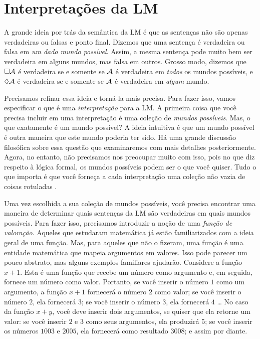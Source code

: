 \section{Interpretações da LM}

A grande ideia por trás da semântica da LM é que as sentenças não são apenas verdadeiras ou falsas e ponto final.  Dizemos que uma  sentença é verdadeira ou falsa em \emph{um dado mundo possível}. Assim,  a mesma sentença pode muito bem ser verdadeira em alguns mundos,  mas falsa em outros. Grosso modo, dizemos que $\Box \mathcal{A}$ é verdadeira   se e somente se $\mathcal{A}$ é verdadeira em \emph{todos} os mundos possíveis, e $\Diamond\mathcal{A}$ é verdadeira se e somente se  $\mathcal{A}$ é verdadeira em \emph{algum} mundo.

Precisamos refinar essa ideia e torná-la mais precisa. Para fazer isso,  vamos especificar o que é uma  \emph{interpretação} para a LM. A primeira coisa que você precisa incluir em uma interpretação é uma coleção de \emph{mundos possíveis}. Mas, o que exatamente é um mundo possível? A ideia intuitiva é que um mundo possível é outra maneira que este mundo poderia ter sido. Há uma grande discussão filosófica sobre  essa questão que examinaremos com mais detalhes posteriormente. Agora, no entanto,  não precisamos nos preocupar muito com isso, pois no que diz respeito à lógica formal, os mundos possíveis podem ser o que você quiser. Tudo o que importa é que você forneça a cada interpretação uma coleção não vazia de coisas rotuladas .
 
Uma vez escolhida  a  sua coleção de mundos possíveis, você precisa encontrar uma maneira de determinar quais sentenças da LM são verdadeiras em quais mundos possíveis. Para fazer isso, precisamos introduzir a noção de uma \emph{função de valoração}. Aqueles que estudaram matemática já estão familiarizados com a ideia geral de uma função. Mas, para aqueles que não o fizeram, uma função é uma entidade matemática que mapeia argumentos em valores. Isso pode parecer um pouco abstrato, mas alguns exemplos familiares ajudarão. Considere a função $x + 1$. Esta é uma função que recebe um número como argumento e, em seguida, fornece um número como valor. Portanto, se você inserir o número $1$ como um argumento, a função $x + 1$ fornecerá o número $2$ como valor; se você inserir o número  $2$, ela fornecerá $3$; se você inserir o número  $3$, ela fornecerá $4$ \dots{}  No caso da função $x + y$, você deve inserir dois argumentos, se quiser que ela retorne um valor: se você inserir $2$ e $3$ como seus argumentos, ela produzirá $5$; se você inserir os números  $1003$ e $2005$, ela fornecerá como resultado $3008$; e assim por diante.

